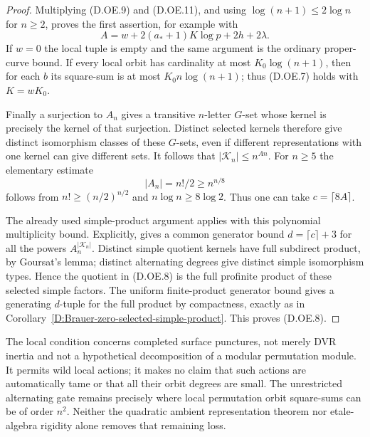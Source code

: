 \begin{proof}
Multiplying (D.OE.9) and (D.OE.11), and using
$\log(n+1)\le2\log n$ for $n\ge2$, proves the first assertion, for
example with
\[
        A=w+2(a_*+1)K\log p+2h+2\lambda.                 \tag{D.OE.12}
\]
If $w=0$ the local tuple is empty and the same argument is the
ordinary proper-curve bound. If every local orbit has cardinality
at most $K_0\log(n+1)$, then for each $b$ its square-sum is at most
$K_0 n\log(n+1)$; thus (D.OE.7) holds with $K=wK_0$.

Finally a surjection to $A_n$ gives a transitive $n$-letter $G$-set
whose kernel is precisely the kernel of that surjection. Distinct
selected kernels therefore give distinct isomorphism classes of
these $G$-sets, even if different representations with one kernel
can give different sets. It follows that
$|\mathcal K_n|\le n^{An}$.
For $n\ge5$ the elementary estimate
\[
                           |A_n|=n!/2\ge n^{n/8}           \tag{D.OE.13}
\]
follows from $n!\ge(n/2)^{n/2}$ and
$n\log n\ge8\log2$. Thus one can take $c=\lceil8A\rceil$.

The already used simple-product argument applies with this
polynomial multiplicity bound. Explicitly,
\citet[Proposition~2.6(ii), equations (2.1)--(2.2), pp.~12--13]
{LucchiniMarionTracey2020D} gives a common generator bound
$d=\lceil c\rceil+3$ for all the powers $A_n^{|\mathcal K_n|}$.
Distinct simple quotient kernels have full subdirect product,
by Goursat's lemma; distinct alternating degrees give distinct
simple isomorphism types. Hence the quotient in (D.OE.8) is the
full profinite product of these selected simple factors.
The uniform finite-product generator bound gives a generating
$d$-tuple for the full product by compactness, exactly as in
Corollary~\ref{D:Brauer-zero-selected-simple-product}.
This proves (D.OE.8).
\end{proof}

\begin{remark}
The local condition concerns completed surface punctures, not merely
DVR inertia and not a hypothetical decomposition of a modular
permutation module. It permits wild local actions; it makes no
claim that such actions are automatically tame or that all their
orbit degrees are small. The unrestricted alternating gate remains
precisely where local permutation orbit square-sums can be of order
$n^2$. Neither the quadratic ambient representation theorem nor
etale-algebra rigidity alone removes that remaining loss.
\end{remark}
